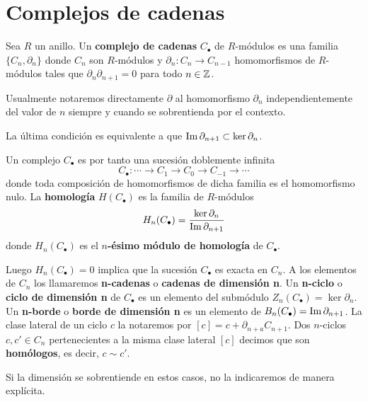 \section{Complejos de cadenas}

\begin{definicion}
	Sea \(R\) un anillo. Un \textbf{complejo de cadenas} \(C_{\bullet}\) de \(R\)-módulos
	es una familia \(\{C_{n}, \partial_{n}\}\) donde \(C_{n}\) son \(R\)-módulos y \(\partial
	_{n}: C_{n}\rightarrow C_{n-1}\) homomorfismos de \(R\)-módulos tales que \(\partial
	_{n}\partial_{n+1}= 0\) para todo \(n \in \mathbb{Z}\).
\end{definicion}
\begin{nota}
	Usualmente notaremos directamente \(\partial\) al homomorfismo \(\partial_{n}\) independientemente
	del valor de \(n\) siempre y cuando se sobrentienda por el contexto.
\end{nota}
\begin{observacion}
	La última condición es equivalente a que \(\operatorname{Im}{\partial_{n+1}}\subset \ker{\partial_n}\).
\end{observacion}
Un complejo \(C_{\bullet}\) es por tanto una sucesión doblemente infinita
\[
C_{\bullet}: \cdots \rightarrow C_{1}\rightarrow C_{0}\rightarrow C_{-1}\rightarrow
\cdots
\]
donde toda composición de homomorfismos de dicha familia es el homomorfismo nulo.
La \textbf{homología} \(H(C_{\bullet})\) es la familia de \(R\)-módulos
\[
H_{n}(C_{\bullet}) = \frac{\ker \partial_{n}}{\operatorname{Im} \partial_{n+1}}
\]
donde \(H_{n}(C_{\bullet})\) es el \textbf{\(n\)-ésimo módulo de homología} de
\(C_{\bullet}\).

Luego \(H_{n}(C_{\bullet})=0\) implica que la sucesión \(C_{\bullet}\) es exacta en
\(C_{n}\). A los elementos de \(C_{n}\) los llamaremos \textbf{n-cadenas} o \textbf{cadenas
	de dimensión n}. Un \textbf{n-ciclo} o \textbf{ciclo de dimensión n} de
\(C_{\bullet}\) es un elemento del submódulo
\(Z_{n}(C_{\bullet}) = \ker \partial_{n}\). Un \textbf{n-borde} o \textbf{borde de
	dimensión n} es un elemento de \(B_{n}(C_{\bullet})= \operatorname{Im}{\partial_{n+1}}\). La
clase lateral de un ciclo \(c\) la notaremos por \([c] = c + \partial_{n+a}C_{n+1}\).
Dos \(n\)-ciclos \(c,c' \in C_{n}\) pertenecientes a la misma clase lateral \([c]\) decimos
que son \textbf{homólogos}, es decir, \(c \sim c'\).

\begin{nota}
	Si la dimensión se sobrentiende en estos casos, no la indicaremos de manera
	explícita.
\end{nota}

